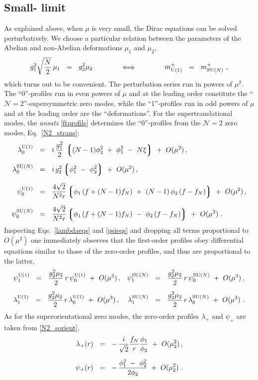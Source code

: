\documentclass[12pt]{article}
\def\beq{\begin{equation}}
\def\eeq{\end{equation}}
\newcommand{\ntwo}{${\mathcal N}=2$ }
\newcommand{\ntwon}{${\mathcal N}=2$}
\newcommand{\lgr}{\left\lgroup}
\newcommand{\rgr}{\right\rgroup}
\newcommand{\mUp}{m_{\rm U(1)}^{+}}
\newcommand{\mNp}{m_\text{SU($N$)}^{+}}
\newcommand{\loU}{\lambda_0^{\rm U(1)}}
\newcommand{\llU}{\lambda_1^{\rm U(1)}}
\newcommand{\loN}{\lambda_0^\text{SU($N$)}}
\newcommand{\llN}{\lambda_1^\text{SU($N$)}}
\newcommand{\poU}{\psi_0^{\rm U(1)}}
\newcommand{\plU}{\psi_1^{\rm U(1)}}
\newcommand{\poN}{\psi_0^\text{SU($N$)}}
\newcommand{\plN}{\psi_1^\text{SU($N$)}}
\begin{document}
\subsection{Small-\boldmath{$\mu$} limit}
As explained above, when $ \mu $ is very small, the Dirac equations can be solved perturbatively. 
We choose a particular relation between the parameters of the Abelian and non-Abelian deformations $ \mu_1 $ 
and $ \mu_2 $,
\beq
\label{mueq}
	g_1^2 \sqrt{\frac{N}{2}}\, \mu_1 ~~=~~ g_2^2 \mu_2  \qquad\qquad \Longleftrightarrow \qquad\qquad 
		\mUp  ~~=~~ \mNp~,
\eeq
which turns out to be convenient.
The perturbation series run in powers of $ \mu^2 $.
The ``0''-profiles run in even powers of $ \mu $ and at the leading order constitute the ``\ntwon''-supersymmetric zero modes, 
while the ``1''-profiles run in odd powers of $ \mu $ and at the leading order are the ``deformations''.
For the supertranslational modes, the {\it ansatz} \eqref{ftprofile} determines the ``0''-profiles
from the  \ntwo zero modes, Eq.~\eqref{N2_strans}:
\begin{align}
%
\notag
	\loU & ~~=~~ i\, \frac{g_1^2}{2}\, \lgr (N-1) \phi_2^2 ~+~ \phi_1^2 ~-~ N\xi \rgr  ~+~ O(\mu^2)\,, 
	\\[2mm]
%
\notag
	\loN & ~~=~~ i\, g_2^2 \lgr \phi_1^2 ~-~ \phi_2^2 \rgr ~+~ O(\mu^2)\,,
	\\[2mm]
%
\label{tzeroorder}
	\poU & ~~=~~ \frac{4\sqrt{2}}{N^2 r} \lgr \phi_1\, (f + (N-1) f_N) ~+~ (N-1)\, \phi_2\, (f-f_N) \rgr ~+~ O(\mu^2)\,,
	\\[2mm]
%
\notag
	\poN & ~~=~~ \frac{4\sqrt{2}}{N^2 r} \lgr \phi_1\, (f + (N-1) f_N) ~-~ \phi_2\, (f-f_N) \rgr ~+~ O(\mu^2)
	~.
\end{align}
	Inspecting Eqs.~\eqref{lambdaeqs} and \eqref{psieqs} and dropping all terms proportional to $ O(\mu^2) $ one 
	immediately observes that the first-order profiles obey  differential equations similar
	to those of the zero-order 
	profiles, and thus are proportional to the latter,
\begin{align}
%
\notag
	& \plU ~~=~~ \frac{g_2^2\mu_2}{2}\, r \, \poU ~+~ O(\mu^3)\,,		& \plN &~~=~~ \frac{g_2^2\mu_2}{2}\, r\, \poN ~+~ O(\mu^3)  \,,
	\\[2mm]
%
\label{tfirstorder}
	& \llU ~~=~~ \frac{g_2^2\mu_2}{2}\, r \, \loU ~+~ O(\mu^3)\,,		& \llN &~~=~~ \frac{g_2^2\mu_2}{2}\, r\, \loN ~+~ O(\mu^3)~.
\end{align}
As for the superorientational zero modes, the zero-order profiles $ \lambda_+ $ and $ \psi_+ $ are taken from
	\eqref{N2_sorient},
\begin{align}
%
\notag
 	\lambda_+(r) & ~~=~~ -\, \frac{i}{\sqrt{2}} \frac{f_N}{r} \frac{\phi_1}{\phi_2}  ~+~ 
	O(\mu_2^2) \,,\\[2mm]
%
\label{zeroorder}
	\psi_+(r) & ~~=~~ -\, \frac{\phi_1^2 ~-~ \phi_2^2}{2\phi_2} ~+~ O(\mu_2^2)~.
\end{align}
\end{document}
